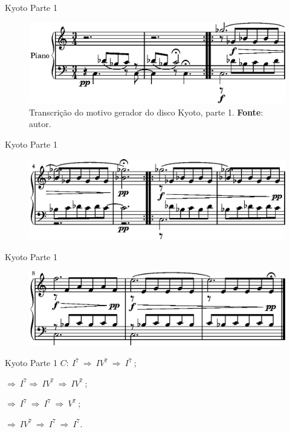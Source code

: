 \documentclass[aspectratio=169]{beamer}
\begin{document}
\begin{frame}{Kyoto Parte 1}
\begin{figure}[!h]
  \centering
  \includegraphics{5c/lily-03a7ab98-1}%
  \caption{Transcrição do motivo gerador do disco Kyoto, parte 1. \textbf{Fonte}: autor.}
  \label{fig:Jarret_intro2}
\end{figure}
\end{frame}

\begin{frame}{Kyoto Parte 1}
\begin{figure}[!h]
  \centering
\includegraphics{5c/lily-03a7ab98-2}%
\end{figure}
\end{frame}

\begin{frame}{Kyoto Parte 1}
\begin{figure}[!h]
  \centering
\includegraphics{5c/lily-03a7ab98-3}
\end{figure}
\end{frame}

\begin{frame}{Kyoto Parte 1}
$C:~I^7~\Rightarrow~IV^7~\Rightarrow~I^7~$;

$\Rightarrow~I^7\Rightarrow~IV^7~\Rightarrow~IV^7~$;

$\Rightarrow~I^7~\Rightarrow~I^7~\Rightarrow~V^7~$;

$\Rightarrow~IV^7~\Rightarrow~I^7~\Rightarrow~I^7$.
\end{frame}
\end{document}
